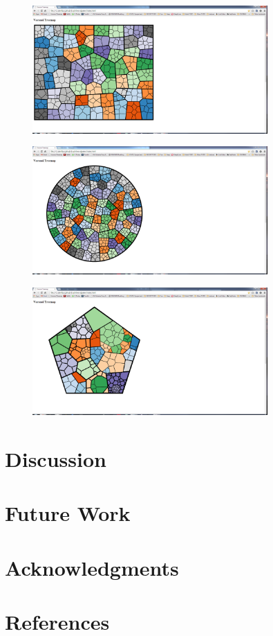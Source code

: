 \documentclass{acm_proc_article-sp}
\begin{document}
\begin{figure}
\centering
\includegraphics[width=90mm]{source images/random-10-3-025-rect.png}
\caption{}
\end{figure}
\begin{figure}
\centering
\includegraphics[width=90mm]{source images/random-10-3-000-circle.png}
\caption{}
\end{figure}
\begin{figure}
\centering
\includegraphics[width=90mm]{source images/flare-color-pentagon-100.png}
\caption{}
\end{figure}


\section{Discussion}


\section{Future Work}


\section{Acknowledgments}


\section{References}


{}

\end{document}

